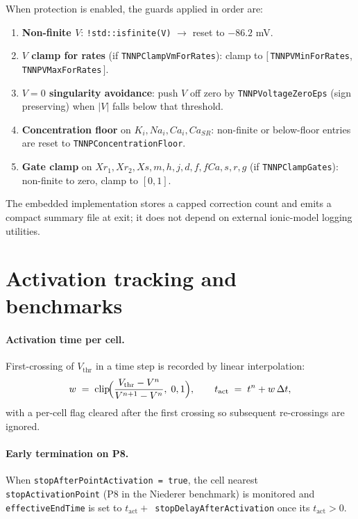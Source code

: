 \documentclass[11pt,a4paper]{article}
\newcommand{\code}[1]{\texttt{\small #1}}
\begin{document}
When protection is enabled, the guards applied in order are:
\begin{enumerate}[topsep=0pt,itemsep=2pt]
  \item \textbf{Non-finite $V$}: \code{!std::isfinite(V)} $\rightarrow$
        reset to $-86.2$ mV.
  \item \textbf{$V$ clamp for rates} (if \code{TNNPClampVmForRates}):
        clamp to $[\,$\code{TNNPVMinForRates}, \code{TNNPVMaxForRates}$\,]$.
  \item \textbf{$V=0$ singularity avoidance}: push $V$ off zero by
        \code{TNNPVoltageZeroEps} (sign preserving) when
        $\lvert V \rvert$ falls below that threshold.
  \item \textbf{Concentration floor} on $K_{i}, Na_{i}, Ca_{i}, Ca_{SR}$:
        non-finite or below-floor entries are reset to
        \code{TNNPConcentrationFloor}.
  \item \textbf{Gate clamp} on $Xr_{1}, Xr_{2}, Xs, m, h, j, d, f, fCa,
        s, r, g$ (if \code{TNNPClampGates}): non-finite to zero,
        clamp to $[0, 1]$.
\end{enumerate}

The embedded implementation stores a capped correction count and emits a
compact summary file at exit; it does not depend on external ionic-model
logging utilities.

\section{Activation tracking and benchmarks}

\paragraph{Activation time per cell.}
First-crossing of $V_{\text{thr}}$ in a time step is recorded by linear
interpolation:
\begin{equation}
  w \;=\; \mathrm{clip}\!\Bigl(
      \frac{V_{\text{thr}} - V^{n}}{V^{n+1} - V^{n}},
      \; 0, 1
    \Bigr),
   \qquad
   t_{\text{act}} \;=\; t^{n} + w\, \Delta t,
\end{equation}
with a per-cell flag cleared after the first crossing so subsequent
re-crossings are ignored.

\paragraph{Early termination on P8.}
When \code{stopAfterPointActivation = true}, the cell nearest
\code{stopActivationPoint} (P8 in the Niederer benchmark) is monitored
and \code{effectiveEndTime} is set to $t_{\text{act}} +
$~\code{stopDelayAfterActivation} once its $t_{\text{act}} > 0$.
\end{document}
